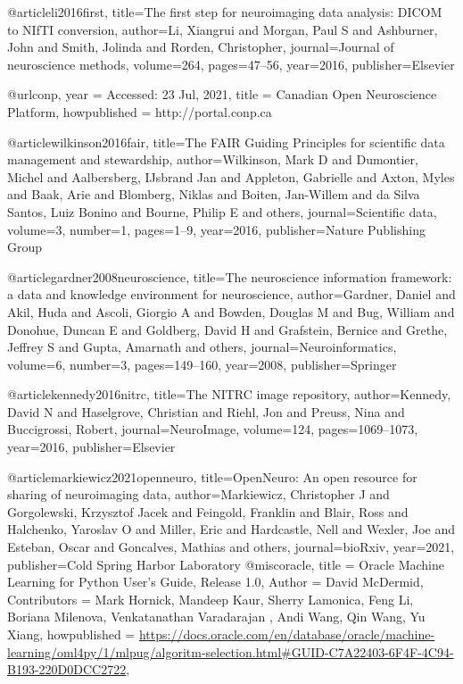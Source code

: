 @article{li2016first,
  title={The first step for neuroimaging data analysis: {DICOM} to {NIfTI} conversion},
  author={Li, Xiangrui and Morgan, Paul S and Ashburner, John and Smith, Jolinda and Rorden, Christopher},
  journal={Journal of neuroscience methods},
  volume={264},
  pages={47--56},
  year={2016},
  publisher={Elsevier}
}

@url{conp,
 year = {Accessed: 23 Jul, 2021},
 title = {Canadian Open Neuroscience Platform},
 howpublished = {http://portal.conp.ca}
}

@article{wilkinson2016fair,
  title={The {FAIR} Guiding Principles for scientific data management and stewardship},
  author={Wilkinson, Mark D and Dumontier, Michel and Aalbersberg, IJsbrand Jan and Appleton, Gabrielle and Axton, Myles and Baak, Arie and Blomberg, Niklas and Boiten, Jan-Willem and da Silva Santos, Luiz Bonino and Bourne, Philip E and others},
  journal={Scientific data},
  volume={3},
  number={1},
  pages={1--9},
  year={2016},
  publisher={Nature Publishing Group}
}

@article{gardner2008neuroscience,
  title={The neuroscience information framework: a data and knowledge environment for neuroscience},
  author={Gardner, Daniel and Akil, Huda and Ascoli, Giorgio A and Bowden, Douglas M and Bug, William and Donohue, Duncan E and Goldberg, David H and Grafstein, Bernice and Grethe, Jeffrey S and Gupta, Amarnath and others},
  journal={Neuroinformatics},
  volume={6},
  number={3},
  pages={149--160},
  year={2008},
  publisher={Springer}
}


@article{kennedy2016nitrc,
  title={The {NITRC} image repository},
  author={Kennedy, David N and Haselgrove, Christian and Riehl, Jon and Preuss, Nina and Buccigrossi, Robert},
  journal={NeuroImage},
  volume={124},
  pages={1069--1073},
  year={2016},
  publisher={Elsevier}
}


@article{markiewicz2021openneuro,
  title={{OpenNeuro}: An open resource for sharing of neuroimaging data},
  author={Markiewicz, Christopher J and Gorgolewski, Krzysztof Jacek and Feingold, Franklin and Blair, Ross and Halchenko, Yaroslav O and Miller, Eric and Hardcastle, Nell and Wexler, Joe and Esteban, Oscar and Goncalves, Mathias and others},
  journal={bioRxiv},
  year={2021},
  publisher={Cold Spring Harbor Laboratory}
}
@misc{oracle,
    title = {Oracle Machine Learning for {P}ython User's Guide, Release 1.0},  
    Author = {David McDermid},
    Contributors = {Mark Hornick, Mandeep Kaur, Sherry Lamonica, Feng Li, Boriana Milenova, Venkatanathan Varadarajan , Andi Wang, Qin Wang, Yu Xiang},
    howpublished = {\url{https://docs.oracle.com/en/database/oracle/machine-learning/oml4py/1/mlpug/algoritm-selection.html#GUID-C7A22403-6F4F-4C94-B193-220D0DCC2722}},
}


